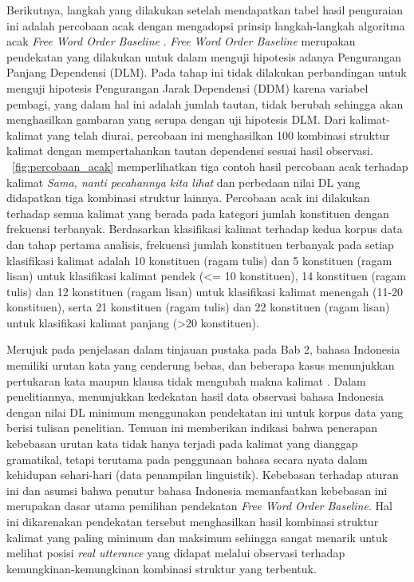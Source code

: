 Berikutnya, langkah yang dilakukan setelah mendapatkan tabel hasil penguraian ini adalah percobaan acak dengan mengadopsi prinsip langkah-langkah algoritma acak \textit{Free Word Order Baseline} \citep{futrell2015large}. \textit{Free Word Order Baseline} merupakan pendekatan yang dilakukan untuk \cite{futrell2015large} dalam menguji hipotesis adanya Pengurangan Panjang Dependensi (DLM). Pada tahap ini tidak dilakukan perbandingan untuk menguji hipotesis Pengurangan Jarak Dependensi (DDM) karena variabel pembagi, yang dalam hal ini adalah jumlah tautan, tidak berubah sehingga akan menghasilkan gambaran yang serupa dengan uji hipotesis DLM. Dari kalimat-kalimat yang telah diurai, percobaan ini menghasilkan 100 kombinasi struktur kalimat dengan mempertahankan tautan dependensi sesuai hasil observasi. \pic~\ref{fig:percobaan_acak} memperlihatkan tiga contoh hasil percobaan acak terhadap kalimat \textit{Sama, nanti pecahannya kita lihat} dan perbedaan nilai DL yang didapatkan tiga kombinasi struktur lainnya. Percobaan acak ini dilakukan terhadap semua kalimat yang berada pada kategori jumlah konstituen dengan frekuensi terbanyak. Berdasarkan klasifikasi kalimat terhadap kedua korpus data dan tahap pertama analisis, frekuensi jumlah konstituen terbanyak pada setiap klasifikasi kalimat adalah 10 konstituen (ragam tulis) dan 5 konstituen (ragam lisan) untuk klasifikasi kalimat pendek (\textless= 10 konstituen), 14 konstituen (ragam tulis) dan 12 konstituen (ragam lisan) untuk klasifikasi kalimat menengah (11-20 konstituen), serta 21 konstituen (ragam tulis) dan 22 konstituen (ragam lisan) untuk klasifikasi kalimat panjang (\textgreater 20 konstituen). 

Merujuk pada penjelasan dalam tinjauan pustaka pada Bab 2, bahasa Indonesia memiliki urutan kata yang cenderung bebas, dan beberapa kasus menunjukkan pertukaran kata maupun klausa tidak mengubah makna kalimat \citep{sneddon2010indonesian}. Dalam penelitiannya, \cite{futrell2015large} menunjukkan kedekatan hasil data observasi bahasa Indonesia dengan nilai DL minimum menggunakan pendekatan ini untuk korpus data yang berisi tulisan penelitian. Temuan ini memberikan indikasi bahwa penerapan kebebasan urutan kata tidak hanya terjadi pada kalimat yang dianggap gramatikal, tetapi terutama pada penggunaan bahasa secara nyata dalam kehidupan sehari-hari (data penampilan linguistik). Kebebasan terhadap aturan ini dan asumsi bahwa penutur bahasa Indonesia memanfaatkan kebebasan ini merupakan dasar utama pemilihan pendekatan \textit{Free Word Order Baseline}. Hal ini dikarenakan pendekatan tersebut menghasilkan hasil kombinasi struktur kalimat yang paling minimum dan maksimum sehingga sangat menarik untuk melihat posisi \textit{real utterance} yang didapat melalui observasi terhadap kemungkinan-kemungkinan kombinasi struktur yang terbentuk. 


